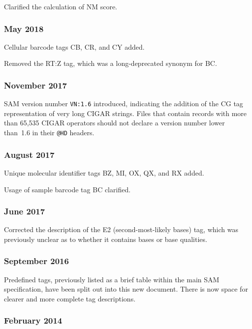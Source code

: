 \documentclass[10pt]{article}
\begin{document}
\begin{appendices}
Clarified the calculation of NM score.

\subsubsection*{May 2018}

Cellular barcode tags CB, CR, and CY added.

Removed the RT:Z tag, which was a long-deprecated synonym for BC.

\subsubsection*{November 2017}

SAM version number {\tt VN:1.6} introduced, indicating the addition of the CG tag representation of very long CIGAR strings.
Files that contain records with more than 65,535 CIGAR operators should not declare a version number lower than~1.6 in their {\tt @HD} headers.

\subsubsection*{August 2017}

Unique molecular identifier tags BZ, MI, OX, QX, and RX added.

Usage of sample barcode tag BC clarified.

\subsubsection*{June 2017}

Corrected the description of the E2 (second-most-likely bases) tag, which was previously unclear as to whether it contains bases or base qualities.

\subsubsection*{September 2016}

Predefined tags, previously listed as a brief table within the main SAM specification, have been split out into this new document.
There is now space for clearer and more complete tag descriptions.

\subsubsection*{February 2014}


\end{appendices}
\end{document}
